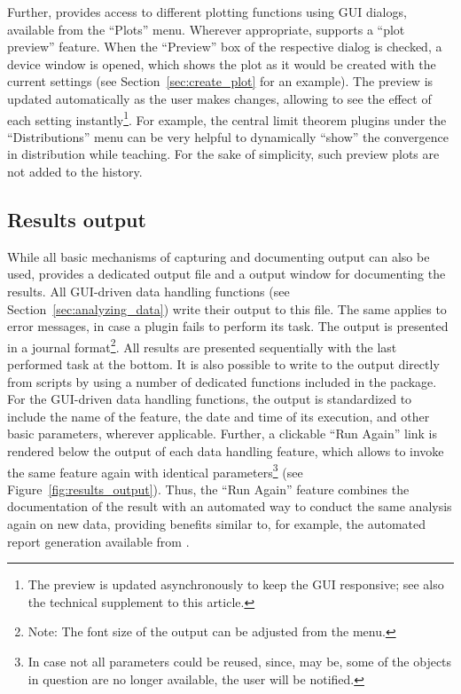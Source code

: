 Further,  provides access to different plotting functions using GUI dialogs,
available from the ``Plots'' menu. Wherever appropriate,  supports a ``plot
preview'' feature. When the ``Preview'' box of
the respective dialog is checked, a device window is opened, which
shows the plot as it would be created with the current settings (see Section~\ref{sec:create_plot} for an example). The
preview is updated automatically as the user makes changes, allowing to
see the effect of each setting instantly\footnote{The preview is
updated asynchronously to keep the GUI responsive; see also the technical supplement to this article.}. For example, the
central limit theorem plugins
under the ``Distributions'' menu can be very helpful to dynamically ``show''
the convergence in distribution while teaching. For the sake of simplicity, such preview plots are not added to
the history.

\subsection{Results output}
\label{sec:results_output}

While all basic mechanisms of
capturing and documenting  output can also
be used,  provides a dedicated output file and a output
window for documenting the results. All GUI-driven data handling
functions (see Section~\ref{sec:analyzing_data}) write their output to this file. 
The same applies to error messages, in case a plugin fails to perform its task.
The output is presented in a journal format\footnote{Note: The font size of the output can be adjusted
from the menu. 
}. All results are presented
sequentially with the last performed task at the bottom.
It is also possible to write to the output directly from 
scripts by using a number of dedicated 
functions included in the  package. For the GUI-driven data handling functions, the output is
standardized to include the name of the feature, the date and time of
its execution, and other basic parameters, wherever
applicable. Further, a clickable ``Run
Again'' link is rendered below the output of each data
handling feature, which allows to invoke the same feature again with
identical parameters\footnote{In case not all parameters could be
reused, since, may be, some of the objects in
question are no longer available, the user will be notified.} (see
Figure~\ref{fig:results_output}). Thus, the ``Run
Again'' feature combines the documentation of the result
with an automated way to conduct the same analysis again on new
data, providing benefits similar to, for example, the automated report generation
available from  \citep{RaffelsbergerW2008}.


